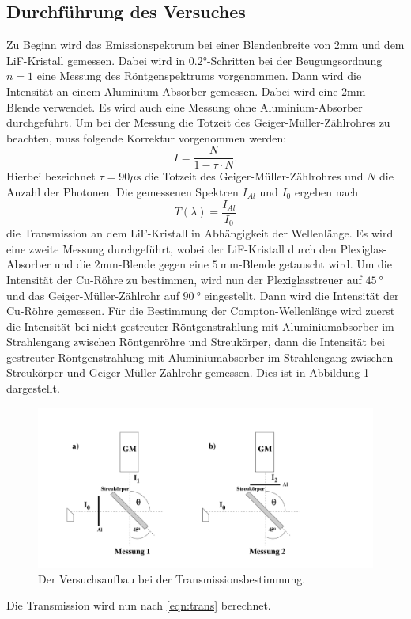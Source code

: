 \subsection{Durchführung des Versuches}
Zu Beginn wird das Emissionspektrum bei einer Blendenbreite von $2 \si{\milli\meter}$ und dem LiF-Kristall gemessen. Dabei wird in $0.2 \si{\degree}$-Schritten bei der Beugungsordnung $n = 1$ eine Messung des
Röntgenspektrums vorgenommen. Dann wird die Intensität an einem Aluminium-Absorber gemessen. Dabei wird eine $2 \si{\milli\meter}$ -Blende verwendet. Es wird auch eine Messung ohne Aluminium-Absorber
durchgeführt.
Um bei der Messung die Totzeit des Geiger-Müller-Zählrohres zu beachten, muss folgende Korrektur vorgenommen werden:
\begin{equation}
	I = \frac{N}{1 - \tau \cdot N}.
  \label{eqn:(4)}
\end{equation}
Hierbei bezeichnet $\tau = 90 \mu \si{\second}$ die Totzeit des Geiger-Müller-Zählrohres und $N$ die Anzahl der Photonen.
Die gemessenen Spektren $I_{Al}$ und $I_0$ ergeben nach
\begin{equation}
	T(\lambda) = \frac{I_{Al}}{I_0}
	\label{eqn:trans}
\end{equation}
die Transmission an dem LiF-Kristall in Abhängigkeit der Wellenlänge.
Es wird eine zweite Messung durchgeführt, wobei der LiF-Kristall durch den Plexiglas-Absorber und die $2 \si{\milli\meter}$-Blende gegen eine $\SI{5}{\milli\meter}$-Blende getauscht wird.
Um die Intensität der Cu-Röhre zu bestimmen, wird nun der Plexiglasstreuer auf $\SI{45}{\degree}$ und das Geiger-Müller-Zählrohr auf $\SI{90}{\degree}$ eingestellt. Dann wird die Intensität der Cu-Röhre gemessen.
Für die Bestimmung der Compton-Wellenlänge wird zuerst die Intensität bei nicht gestreuter Röntgenstrahlung mit Aluminiumabsorber im Strahlengang zwischen Röntgenröhre und Streukörper,
dann die Intensität bei gestreuter Röntgenstrahlung mit Aluminiumabsorber im Strahlengang zwischen Streukörper und Geiger-Müller-Zählrohr gemessen.
Dies ist in Abbildung \ref{fig:versuchsaufbau2} dargestellt.

\begin{figure}[H]
  \centering
  \includegraphics[scale=0.3]{content/versuchsaufbau2.png}
  \caption{Der Versuchsaufbau bei der Transmissionsbestimmung. \cite{AP01}}
  \label{fig:versuchsaufbau2}
\end{figure}
Die Transmission wird nun nach \eqref{eqn:trans} berechnet.
